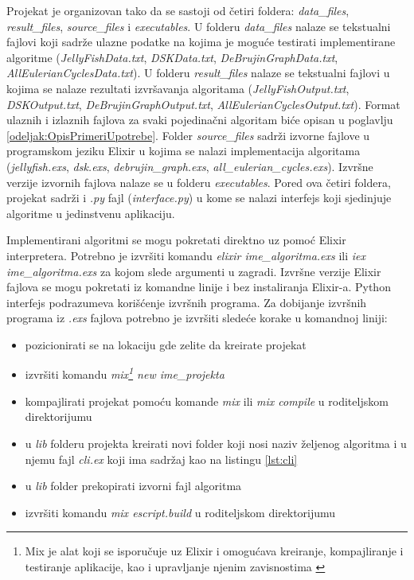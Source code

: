 \documentclass[12pt,oneside]{memoir}
\begin{document}
Projekat je organizovan tako da se sastoji od četiri foldera: \textit{data\_files}, \textit{result\_files}, \textit{source\_files} i \textit{executables}. U folderu \textit{data\_files} nalaze se tekstualni fajlovi koji sadrže ulazne podatke na kojima je moguće testirati implementirane algoritme (\textit{JellyFishData.txt}, \textit{DSKData.txt}, \textit{DeBrujinGraphData.txt}, \textit{AllEulerianCyclesData.txt}). U folderu \textit{result\_files} nalaze se tekstualni fajlovi u kojima se nalaze rezultati izvršavanja algoritama (\textit{JellyFishOutput.txt}, \textit{DSKOutput.txt}, \textit{DeBrujinGraphOutput.txt}, \textit{AllEulerianCyclesOutput.txt}). Format ulaznih i izlaznih fajlova za svaki pojedinačni algoritam biće opisan u poglavlju \ref{odeljak:OpisPrimeriUpotrebe}. Folder \textit{source\_files} sadrži izvorne fajlove u programskom jeziku Elixir u kojima se nalazi implementacija algoritama (\textit{jellyfish.exs}, \textit{dsk.exs}, \textit{debrujin\_graph.exs}, \textit{all\_eulerian\_cycles.exs}). Izvršne verzije izvornih fajlova nalaze se u folderu \textit{executables}. Pored ova četiri foldera, projekat sadrži i \textit{.py} fajl (\textit{interface.py}) u kome se nalazi interfejs koji sjedinjuje algoritme u jedinstvenu aplikaciju.


Implementirani algoritmi se mogu pokretati direktno uz pomoć Elixir interpretera. Potrebno je izvršiti komandu \textit{elixir ime\_algoritma.exs} ili \textit{iex ime\_algoritma.exs} za kojom slede argumenti u zagradi. Izvršne verzije Elixir fajlova se mogu pokretati iz komandne linije i bez instaliranja Elixir-a. Python interfejs podrazumeva korišćenje izvršnih programa. Za dobijanje izvršnih programa iz \textit{.exs} fajlova potrebno je izvršiti sledeće korake u komandnoj liniji:

\begin{itemize}
\itemsep0em 
    \item {pozicionirati se na lokaciju gde zelite da kreirate projekat}
     \item {izvršiti komandu \textit{mix\footnote{Mix je alat koji se isporučuje uz Elixir i omogućava kreiranje, kompajliranje i testiranje aplikacije, kao i upravljanje njenim zavisnostima \cite{Mix}} new ime\_projekta}}
     \item {kompajlirati projekat pomoću komande \textit{mix} ili \textit{mix compile} u roditeljskom direktorijumu}
     \item {u \textit{lib} folderu projekta kreirati novi folder koji nosi naziv željenog algoritma i u njemu fajl \textit{cli.ex} koji ima sadržaj kao na listingu \ref{lst:cli}}
     \item {u \textit{lib} folder prekopirati izvorni fajl algoritma}
     \item {izvršiti komandu \textit{mix escript.build} u roditeljskom direktorijumu}
\end{itemize}
\end{document}
